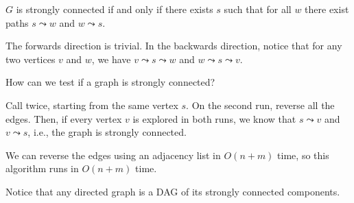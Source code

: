 \begin{corollary}
  $G$ is strongly connected if and only if there exists $s$
  such that for all $w$ there exist paths $s \leadsto w$ and $w \leadsto s$.
\end{corollary}
\begin{prf}
  The forwards direction is trivial.
  In the backwards direction, notice that for any two vertices $v$ and $w$,
  we have $v \leadsto s \leadsto w$ and $w \leadsto s \leadsto v$.
\end{prf}

\begin{problem}
  How can we test if a graph is strongly connected?
\end{problem}
\begin{sol}
  Call  twice, starting from the same vertex $s$.
  On the second run, reverse all the edges.
  Then, if every vertex $v$ is explored in both runs,
  we know that $s \leadsto v$ and $v \leadsto s$,
  i.e., the graph is strongly connected.

  We can reverse the edges using an adjacency list in $O(n+m)$ time,
  so this algorithm runs in $O(n+m)$ time.
\end{sol}

Notice that any directed graph is a DAG of its strongly connected components.
